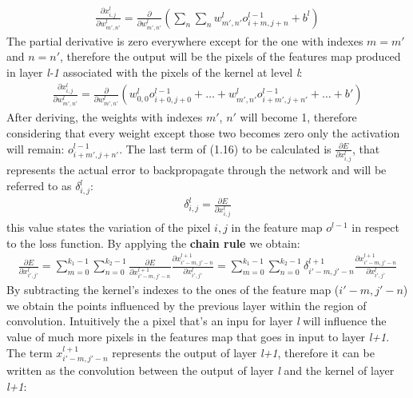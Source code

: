 \documentclass[11pt,a4paper,titlepage]{book}
\begin{document}
\begin{align}
    \frac{\partial x_{i,j}^l}{\partial w_{m',n'}^l} = \frac{\partial}{\partial w_{m',n'}^l} ( \sum_{n} \sum_{n} w_{m',n'}^l o_{i+m,j+n}^{l-1} + b^l )
\end{align}
The partial derivative is zero everywhere except for the one with indexes $m = m'$ and $n = n'$, therefore the output will be the pixels of the features map produced in layer \textit{l-1} associated with the pixels of the kernel at level \textit{l}:
\begin{align}
    \frac{\partial x_{i,j}^l}{\partial w_{m',n'}^l} = \frac{\partial}{\partial w_{m',n'}^l} (w_{0,0}^l o_{i+0, j+0}^{l-1} + \dots + w_{m',n'}^l o_{i+m', j+n'}^{l-1} + \dots + b' )
\end{align}
After deriving, the weights with indexes $m'$, $n'$ will become 1, therefore considering that every weight except those two becomes zero only the activation will remain: $o_{i+m', j+n'}^{l-1}$. 
\newline
The last term of (1.16) to be calculated is $\frac{\partial E}{\partial x_{i,j}^l}$, that represents the actual error to backpropagate through the network and will be referred to as $\delta_{i,j}^l$:
\begin{align}
    \delta_{i,j}^l = \frac{\partial E}{\partial x_{i,j}^l}
\end{align}
this value states the variation of the pixel $i,j$ in the feature map $o^{l-1}$ in respect to the loss function. By applying the \textbf{chain rule} we obtain:
\begin{align}
    \frac{\partial E}{\partial x_{i',j'}^l} = \sum_{m=0}^{k_1-1} \sum_{n=0}^{k_2-1} \frac{\partial E}{\partial x_{i'-m,j'-n}^{l+1}} \frac{\partial x_{i'-m,j'-n}^{l+1}}{\partial x_{i',j'}^l} = \sum_{m=0}^{k_1-1} \sum_{n=0}^{k_2-1} \delta_{i'-m,j'-n}^{l+1} \frac{\partial x_{i'-m,j'-n}^{l+1}}{\partial x_{i',j'}^l} 
\end{align}
By subtracting the kernel's indexes to the ones of the feature map ($i'-m,j'-n$) we obtain the points influenced by the previous layer within the region of convolution. Intuitively the a pixel that's an inpu for layer \textit{l} will influence the value of much more pixels in the features map that goes in input to layer \textit{l+1}. 
\newline
The term $x_{i'-m,j'-n}^{l+1}$ represents the output of layer \textit{l+1}, therefore it can be written as the convolution between the output of layer \textit{l} and the kernel of layer \textit{l+1}:
\end{document}
